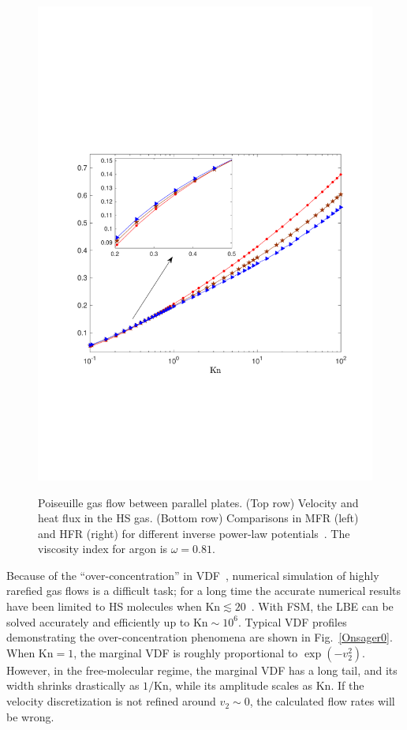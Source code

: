 \begin{figure}[t]
	{\includegraphics[scale=0.4]{LinearizedBol/IMG/pof_heat.pdf}}
	\caption{ Poiseuille gas flow between parallel plates. (Top row) Velocity and heat flux in the HS gas. (Bottom row) Comparisons in MFR (left) and HFR (right) for different inverse power-law potentials~\cite{lei_Jfm}. The viscosity index for argon is $\omega=0.81$.  } 
	\label{massheat}
\end{figure}


Because of the ``over-concentration'' in VDF~\cite{Takata2011}, numerical simulation of highly rarefied gas flows is a difficult task; for a long time the accurate numerical results have been limited to HS molecules when $\text{Kn}\lesssim20$~\cite{Ohwada_sone_1989,Doi2010}. With FSM, the LBE can be solved accurately and efficiently up to $\text{Kn}\sim10^6$. Typical VDF profiles demonstrating the over-concentration  phenomena are shown in Fig.~\ref{Onsager0}. When $\text{Kn}=1$, the marginal VDF  is roughly proportional to $\exp(-v_2^2)$. However, in the free-molecular  regime, the marginal VDF has a long tail, and its width shrinks drastically as $1/\text{Kn}$, while its amplitude scales as $\text{Kn}$. If the velocity discretization is not refined around $v_2\sim 0$, the calculated flow rates will be wrong. %






